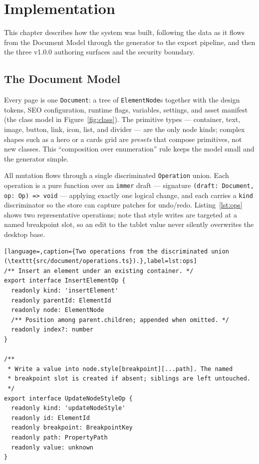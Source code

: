
\chapter{Implementation}
\label{ch:impl}

This chapter describes how the system was built, following the data as it flows
from the Document Model through the generator to the export pipeline, and then the
three v1.0.0 authoring surfaces and the security boundary.

\section{The Document Model}
Every page is one \texttt{Document}: a tree of \texttt{ElementNode}s together with
the design tokens, SEO configuration, runtime flags, variables, settings, and asset
manifest (the class model in Figure~\ref{fig:class}). The primitive types ---
container, text, image, button, link, icon, list, and divider --- are the only node
kinds; complex shapes such as a hero or a cards grid are \emph{presets} that compose
primitives, not new classes. This ``composition over enumeration'' rule keeps the
model small and the generator simple.

All mutation flows through a single discriminated \texttt{Operation} union. Each
operation is a pure function over an \texttt{immer} draft --- signature
\texttt{(draft: Document, op: Op) => void} --- applying exactly one logical change,
and each carries a \texttt{kind} discriminator so the store can capture patches for
undo/redo. Listing~\ref{lst:ops} shows two representative operations; note that
style writes are targeted at a named breakpoint slot, so an edit to the tablet
value never silently overwrites the desktop base.

\begin{lstlisting}[language=,caption={Two operations from the discriminated union (\texttt{src/document/operations.ts}).},label=lst:ops]
/** Insert an element under an existing container. */
export interface InsertElementOp {
  readonly kind: 'insertElement'
  readonly parentId: ElementId
  readonly node: ElementNode
  /** Position among parent.children; appended when omitted. */
  readonly index?: number
}

/**
 * Write a value into node.style[breakpoint][...path]. The named
 * breakpoint slot is created if absent; siblings are left untouched.
 */
export interface UpdateNodeStyleOp {
  readonly kind: 'updateNodeStyle'
  readonly id: ElementId
  readonly breakpoint: BreakpointKey
  readonly path: PropertyPath
  readonly value: unknown
}
\end{lstlisting}


